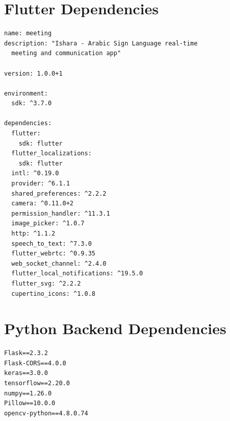\documentclass[11pt,a4paper,twoside]{report}
\begin{document}
\newpage

\appendix

\section{Flutter Dependencies}
\label{app:flutter-dependencies}

\begin{verbatim}
name: meeting
description: "Ishara - Arabic Sign Language real-time 
  meeting and communication app"

version: 1.0.0+1

environment:
  sdk: ^3.7.0

dependencies:
  flutter:
    sdk: flutter
  flutter_localizations:
    sdk: flutter
  intl: ^0.19.0
  provider: ^6.1.1
  shared_preferences: ^2.2.2
  camera: ^0.11.0+2
  permission_handler: ^11.3.1
  image_picker: ^1.0.7
  http: ^1.1.2
  speech_to_text: ^7.3.0
  flutter_webrtc: ^0.9.35
  web_socket_channel: ^2.4.0
  flutter_local_notifications: ^19.5.0
  flutter_svg: ^2.2.2
  cupertino_icons: ^1.0.8
\end{verbatim}

\section{Python Backend Dependencies}
\label{app:python-dependencies}

\begin{verbatim}
Flask==2.3.2
Flask-CORS==4.0.0
keras==3.0.0
tensorflow==2.20.0
numpy==1.26.0
Pillow==10.0.0
opencv-python==4.8.0.74
\end{verbatim}
\end{document}
